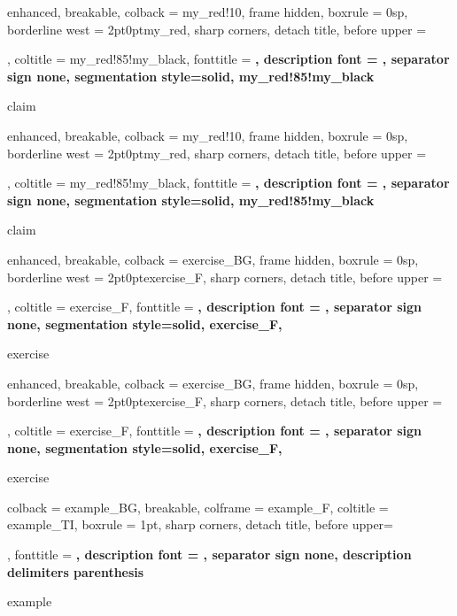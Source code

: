 {%
	enhanced,
	breakable,
	colback = my_red!10,
	frame hidden,
	boxrule = 0sp,
	borderline west = {2pt}{0pt}{my_red},
	sharp corners,
	detach title,
	before upper = \tcbtitle\par\smallskip,
	coltitle = my_red!85!my_black,
	fonttitle = \bfseries\sffamily,
	description font = \mdseries,
	separator sign none,
	segmentation style={solid, my_red!85!my_black}
}
{claim}

{
	enhanced,
	breakable,
	colback = my_red!10,
	frame hidden,
	boxrule = 0sp,
	borderline west = {2pt}{0pt}{my_red},
	sharp corners,
	detach title,
	before upper = \tcbtitle\par\smallskip,
	coltitle = my_red!85!my_black,
	fonttitle = \bfseries\sffamily,
	description font = \mdseries,
	separator sign none,
	segmentation style={solid, my_red!85!my_black}
}
{claim}

{%
	enhanced,
	breakable,
	colback = exercise_BG,
	frame hidden,
	boxrule = 0sp,
	borderline west = {2pt}{0pt}{exercise_F},
	sharp corners,
	detach title,
	before upper = \tcbtitle\par\smallskip,
	coltitle = exercise_F,
	fonttitle = \bfseries\sffamily,
	description font = \mdseries,
	separator sign none,
	segmentation style={solid, exercise_F},
}
{exercise}

{%
	enhanced,
	breakable,
	colback = exercise_BG,
	frame hidden,
	boxrule = 0sp,
	borderline west = {2pt}{0pt}{exercise_F},
	sharp corners,
	detach title,
	before upper = \tcbtitle\par\smallskip,
	coltitle = exercise_F,
	fonttitle = \bfseries\sffamily,
	description font = \mdseries,
	separator sign none,
	segmentation style={solid, exercise_F},
}
{exercise}

{%
	colback = example_BG,
	breakable,
	colframe = example_F,
	coltitle = example_TI,
	boxrule = 1pt,
	sharp corners,
	detach title,
	before upper=\tcbtitle\par\smallskip,
	fonttitle = \bfseries,
	description font = \mdseries,
	separator sign none,
	description delimiters parenthesis
}
{example}

